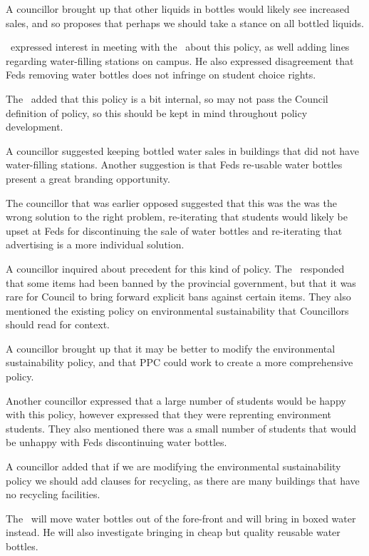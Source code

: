 \begin{motion}
\begin{information}
    A councillor brought up that other liquids in bottles would likely see
    increased sales, and so proposes that perhaps we should take a stance
    on all bottled liquids.  

    \jason\ expressed interest in meeting with the \vpof\ about this policy, 
    as well adding lines regarding water-filling stations on campus. He also
    expressed disagreement that Feds removing water bottles does not infringe
    on student choice rights.

    The \pres\ added that this policy is a bit internal, so may not pass
    the Council definition of policy, so this should be kept in mind
    throughout policy development. 

    A councillor suggested keeping bottled water sales in buildings that did
    not have water-filling stations. Another suggestion is that Feds re-usable
    water bottles present a great branding opportunity. 

    The councillor that was earlier opposed suggested that this was the was
    the wrong solution to the right problem, re-iterating that students
    would likely be upset at Feds for discontinuing the sale of water 
    bottles and re-iterating that advertising is a more individual solution. 

    A councillor inquired about precedent for this kind of policy. The \vpof\ 
    responded that some items had been banned by the provincial government, but
    that it was rare for Council to bring forward explicit bans against 
    certain items. They also mentioned the existing policy on environmental
    sustainability that Councillors should read for context.

    A councillor brought up that it may be better to modify the environmental
    sustainability policy, and that PPC could work to create a more 
    comprehensive policy. 

    Another councillor expressed that a large number of students would be happy
    with this policy, however expressed that they were reprenting environment
    students. They also mentioned there was a small number of students that
    would be unhappy with Feds discontinuing water bottles. 

    A councillor added that if we are modifying the environmental 
    sustainability policy we should add clauses for recycling, as there are 
    many buildings that have no recycling facilities. 

    The \vpof\ will move water bottles out of the fore-front and will bring in
    boxed water instead. He will also investigate bringing in cheap but quality
    reusable water bottles. 


\end{information}
\end{motion}
